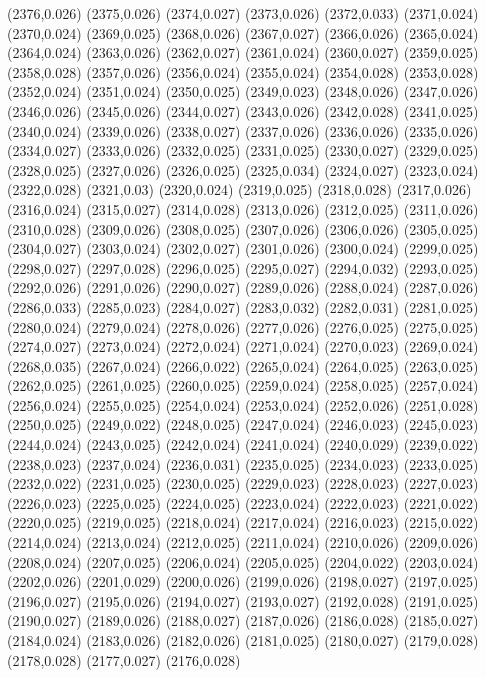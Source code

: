(2376,0.026)
(2375,0.026)
(2374,0.027)
(2373,0.026)
(2372,0.033)
(2371,0.024)
(2370,0.024)
(2369,0.025)
(2368,0.026)
(2367,0.027)
(2366,0.026)
(2365,0.024)
(2364,0.024)
(2363,0.026)
(2362,0.027)
(2361,0.024)
(2360,0.027)
(2359,0.025)
(2358,0.028)
(2357,0.026)
(2356,0.024)
(2355,0.024)
(2354,0.028)
(2353,0.028)
(2352,0.024)
(2351,0.024)
(2350,0.025)
(2349,0.023)
(2348,0.026)
(2347,0.026)
(2346,0.026)
(2345,0.026)
(2344,0.027)
(2343,0.026)
(2342,0.028)
(2341,0.025)
(2340,0.024)
(2339,0.026)
(2338,0.027)
(2337,0.026)
(2336,0.026)
(2335,0.026)
(2334,0.027)
(2333,0.026)
(2332,0.025)
(2331,0.025)
(2330,0.027)
(2329,0.025)
(2328,0.025)
(2327,0.026)
(2326,0.025)
(2325,0.034)
(2324,0.027)
(2323,0.024)
(2322,0.028)
(2321,0.03)
(2320,0.024)
(2319,0.025)
(2318,0.028)
(2317,0.026)
(2316,0.024)
(2315,0.027)
(2314,0.028)
(2313,0.026)
(2312,0.025)
(2311,0.026)
(2310,0.028)
(2309,0.026)
(2308,0.025)
(2307,0.026)
(2306,0.026)
(2305,0.025)
(2304,0.027)
(2303,0.024)
(2302,0.027)
(2301,0.026)
(2300,0.024)
(2299,0.025)
(2298,0.027)
(2297,0.028)
(2296,0.025)
(2295,0.027)
(2294,0.032)
(2293,0.025)
(2292,0.026)
(2291,0.026)
(2290,0.027)
(2289,0.026)
(2288,0.024)
(2287,0.026)
(2286,0.033)
(2285,0.023)
(2284,0.027)
(2283,0.032)
(2282,0.031)
(2281,0.025)
(2280,0.024)
(2279,0.024)
(2278,0.026)
(2277,0.026)
(2276,0.025)
(2275,0.025)
(2274,0.027)
(2273,0.024)
(2272,0.024)
(2271,0.024)
(2270,0.023)
(2269,0.024)
(2268,0.035)
(2267,0.024)
(2266,0.022)
(2265,0.024)
(2264,0.025)
(2263,0.025)
(2262,0.025)
(2261,0.025)
(2260,0.025)
(2259,0.024)
(2258,0.025)
(2257,0.024)
(2256,0.024)
(2255,0.025)
(2254,0.024)
(2253,0.024)
(2252,0.026)
(2251,0.028)
(2250,0.025)
(2249,0.022)
(2248,0.025)
(2247,0.024)
(2246,0.023)
(2245,0.023)
(2244,0.024)
(2243,0.025)
(2242,0.024)
(2241,0.024)
(2240,0.029)
(2239,0.022)
(2238,0.023)
(2237,0.024)
(2236,0.031)
(2235,0.025)
(2234,0.023)
(2233,0.025)
(2232,0.022)
(2231,0.025)
(2230,0.025)
(2229,0.023)
(2228,0.023)
(2227,0.023)
(2226,0.023)
(2225,0.025)
(2224,0.025)
(2223,0.024)
(2222,0.023)
(2221,0.022)
(2220,0.025)
(2219,0.025)
(2218,0.024)
(2217,0.024)
(2216,0.023)
(2215,0.022)
(2214,0.024)
(2213,0.024)
(2212,0.025)
(2211,0.024)
(2210,0.026)
(2209,0.026)
(2208,0.024)
(2207,0.025)
(2206,0.024)
(2205,0.025)
(2204,0.022)
(2203,0.024)
(2202,0.026)
(2201,0.029)
(2200,0.026)
(2199,0.026)
(2198,0.027)
(2197,0.025)
(2196,0.027)
(2195,0.026)
(2194,0.027)
(2193,0.027)
(2192,0.028)
(2191,0.025)
(2190,0.027)
(2189,0.026)
(2188,0.027)
(2187,0.026)
(2186,0.028)
(2185,0.027)
(2184,0.024)
(2183,0.026)
(2182,0.026)
(2181,0.025)
(2180,0.027)
(2179,0.028)
(2178,0.028)
(2177,0.027)
(2176,0.028)
